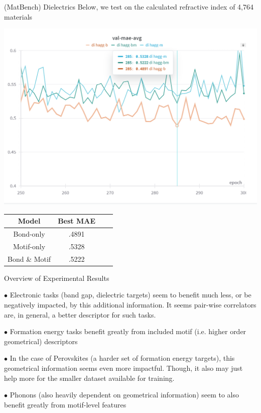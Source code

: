\documentclass[11pt]{beamer}
\begin{document}
\begin{frame}{(MatBench) Dielectrics}\small
Below, we test on the calculated refractive index of 4,764 materials
\begin{center}
\includegraphics[scale=0.43]{dielectric.png}

\medskip

\medskip
\begin{tabular}{c|ccc}
Model & Best MAE \\
\hline
Bond-only & .4891\\
Motif-only & .5328\\
Bond \& Motif & .5222\\
\end{tabular}
\end{center}
\end{frame}

\begin{frame}{Overview of Experimental Results}\small

$\bullet$  Electronic tasks (band gap, dielectric targets) seem to benefit much less, or be negatively impacted, by this additional information. \pause It seems pair-wise correlators are, in general, a better descriptor for such tasks.

\vspace{.5cm}\pause

$\bullet$ Formation energy tasks benefit greatly from included motif (i.e. higher order geometrical) descriptors

\vspace{.5cm}\pause

$\bullet$ In the case of Perovskites (a harder set of formation energy targets), this geometrical information seems even more impactful\pause . Though, it also may just help more for the smaller dataset available for training.

\vspace{.5cm}\pause

$\bullet$ Phonons (also heavily dependent on geometrical information) seem to also benefit greatly from motif-level features

\vspace{.5cm}

\end{frame}
\end{document}
